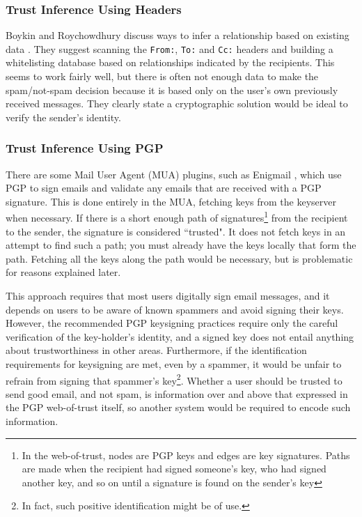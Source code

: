 \documentclass{acm_proc_article-sp}
\begin{document}
\subsubsection{Trust Inference Using Headers}
Boykin and Roychowdhury discuss ways to infer a relationship based on existing data \citep{boykin04email}.  They suggest scanning the \texttt{From:}, \texttt{To:} and \texttt{Cc:} headers and building a whitelisting database based on relationships indicated by the recipients.  This seems to work fairly well, but there is often not enough data to make the spam/not-spam decision because it is based only on the user's own previously received messages. They clearly state a cryptographic solution would be ideal to verify the sender's identity.

\subsubsection{Trust Inference Using PGP}
\label{earlierPGP}
There are some Mail User Agent (MUA) plugins, such as Enigmail \citep{enigmail}, which use PGP to sign emails and validate any emails that are received with a PGP signature.  This is done entirely in the MUA, fetching keys from the keyserver when necessary.  If there is a short enough path of signatures\footnote{In the web-of-trust, nodes are PGP keys and edges are key signatures.  Paths are made when the recipient had signed someone's key, who had signed another key, and so on until a signature is found on the sender's key} from the recipient to the sender, the signature is considered ``trusted".  It does not fetch keys in an attempt to find such a path; you must already have the keys locally that form the path.  Fetching all the keys along the path would be necessary, but is problematic for reasons explained later.

This approach requires that most users digitally sign email messages, and it depends on users to be aware of known spammers and avoid signing their keys. However, the recommended PGP keysigning practices require only the careful verification of the key-holder's identity, and a signed key does not entail anything about trustworthiness in other areas.  Furthermore, if the identification requirements for keysigning are met, even by a spammer, it would be unfair to refrain from signing that spammer's key\footnote{In fact, such positive identification might be of use.}.  Whether a user should be trusted to send good email, and not spam, is information over and above that expressed in the PGP web-of-trust itself, so another system would be required to encode such information.
\end{document}
